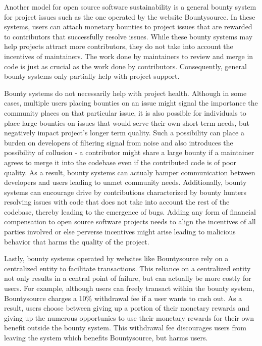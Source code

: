 Another model for open source software sustainability is a general bounty system
for project issues such as the one operated by the website
Bountysource\cite{bountysource}. In these systems, users can attach monetary
bounties to project issues that are rewarded to contributors that successfully
resolve issues. While these bounty systems may help projects attract more
contributors, they do not take into account the incentives of maintainers. The
work done by maintainers to review and merge in code is just
as crucial as the work done by contributors. Consequently, general bounty systems only
partially help with project support.

Bounty systems do not necessarily help with
project health. Although in some cases, multiple users placing bounties on an
issue might signal the importance the community places on that particular issue,
it is also possible for individuals to place large bounties on issues that
would serve their own short-term needs, but negatively impact project's longer term quality. Such a possibility can place a burden
on developers of filtering signal from noise and also introduces the possibility
of collusion - a contributor might share a large bounty if a maintainer agrees
to merge it into the codebase even if the contributed code is of poor quality. As a result, bounty systems can actualy hamper communication
between developers and users leading to unmet community needs. Additionally, bounty systems can encourage drive by contributions characterized
by bounty hunters resolving issues with code that does not take into account the
rest of the codebase, thereby leading to the emergence of bugs. Adding any form of financial compensation to open source
software projects needs to align the incentives of all parties
involved or else perverse incentives might arise leading to malicious behavior
that harms the quality of the project.

Lastly, bounty systems operated by websites like Bountysource rely on a
centralized entity to facilitate transactions. This reliance on a centralized
entity not only results in a central point of failure, but can actually be more
costly for users. For example, although users can freely transact within the bounty system, Bountysource
charges a 10\% withdrawal fee if a user wants to cash out. As a result, users
choose between giving up a portion of their monetary rewards and giving up the numerous
opportunies to use their monetary rewards for their own benefit outside the bounty system. This withdrawal fee
discourages users from leaving the system which benefits Bountysource, but harms users.

